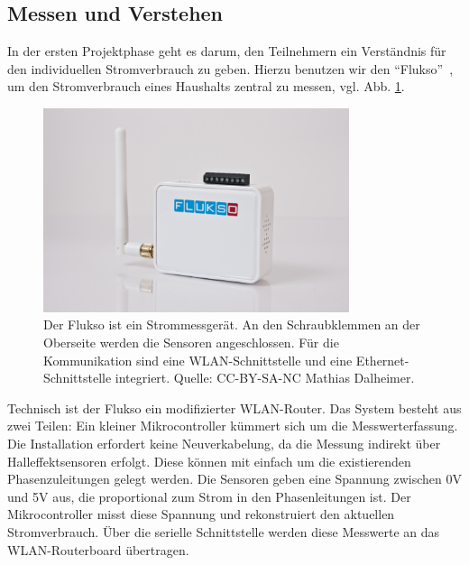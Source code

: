 \documentclass[12pt,BCOR=8.5mm]{scrartcl}
\newcommand*\imgwidth{0.8\textwidth}
\begin{document}
\subsection{Messen und Verstehen}\label{sub:messenverstehen}

In der ersten Projektphase geht es darum, den Teilnehmern ein
Verständnis für den individuellen Stromverbrauch zu geben. Hierzu
benutzen wir den "`Flukso"'~\cite{web:flukso}, um den 
Stromverbrauch eines Haushalts zentral zu messen, vgl. 
Abb. \ref{fig:flukso}.
\begin{figure}[htbp]
  \begin{center}
    \includegraphics[width=\imgwidth]{figures/Flukso.jpg}
    \caption{Der Flukso ist ein Strommessgerät. An den Schraubklemmen
    an der Oberseite werden die Sensoren angeschlossen. Für die
    Kommunikation sind eine WLAN-Schnittstelle und eine
    Ethernet-Schnittstelle integriert. Quelle: CC-BY-SA-NC Mathias
    Dalheimer.}
    \label{fig:flukso}
  \end{center}
\end{figure}
Technisch ist der Flukso ein modifizierter WLAN-Router. Das System
besteht aus zwei Teilen: Ein kleiner Mikrocontroller kümmert sich um die
Messwerterfassung. Die Installation erfordert keine Neuverkabelung, da
die Messung indirekt über Halleffektsensoren erfolgt. Diese können mit
einfach um die existierenden Phasenzuleitungen gelegt werden. Die
Sensoren geben eine Spannung zwischen 0V und 5V aus, die proportional
zum Strom in den Phasenleitungen ist. Der Mikrocontroller misst diese
Spannung und rekonstruiert den aktuellen Stromverbrauch. Über die
serielle Schnittstelle werden diese Messwerte an das WLAN-Routerboard
übertragen. 
\end{document}
